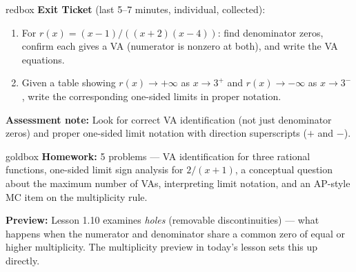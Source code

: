 \documentclass[10pt]{article}
\begin{document}
\begin{skillbox}{redbox}
\textbf{Exit Ticket} (last 5--7 minutes, individual, collected):
\begin{enumerate}
  \item For $r(x) = (x-1)/((x+2)(x-4))$: find denominator zeros, confirm each gives a VA (numerator
        is nonzero at both), and write the VA equations.
  \item Given a table showing $r(x) \to +\infty$ as $x \to 3^+$ and $r(x) \to -\infty$ as
        $x \to 3^-$, write the corresponding one-sided limits in proper notation.
\end{enumerate}
\textbf{Assessment note:} Look for correct VA identification (not just denominator zeros) and
proper one-sided limit notation with direction superscripts ($+$ and $-$).
\end{skillbox}

\begin{skillbox}{goldbox}
\textbf{Homework:} 5 problems --- VA identification for three rational functions, one-sided
limit sign analysis for $2/(x+1)$, a conceptual question about the maximum number of VAs,
interpreting limit notation, and an AP-style MC item on the multiplicity rule.

\textbf{Preview:} Lesson 1.10 examines \textit{holes} (removable discontinuities) --- what
happens when the numerator and denominator share a common zero of equal or higher multiplicity.
The multiplicity preview in today's lesson sets this up directly.
\end{skillbox}
\end{document}
